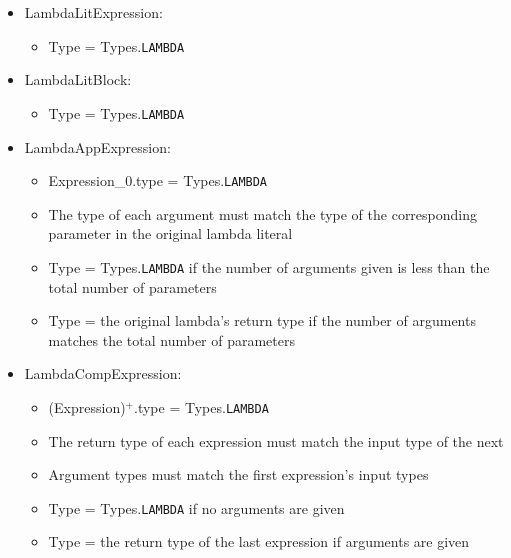 \begin{itemize}
	\item LambdaLitExpression:
		\begin{itemize}
			\item Type = Types.\texttt{LAMBDA}
		\end{itemize}
	\item LambdaLitBlock:
		\begin{itemize}
			\item Type = Types.\texttt{LAMBDA}
		\end{itemize}
	\item LambdaAppExpression:
		\begin{itemize}
			\item Expression\_0.type = Types.\texttt{LAMBDA}
			\item The type of each argument must match the type of the corresponding parameter in the original lambda literal
			\item Type = Types.\texttt{LAMBDA} if the number of arguments given is less than the total number of parameters
			\item Type = the original lambda's return type if the number of arguments matches the total number of parameters
		\end{itemize}
	\item LambdaCompExpression:
		\begin{itemize}
			\item (Expression)$^+$.type = Types.\texttt{LAMBDA}
			\item The return type of each expression must match the input type of the next
			\item Argument types must match the first expression's input types
			\item Type = Types.\texttt{LAMBDA} if no arguments are given
			\item Type = the return type of the last expression if arguments are given
		\end{itemize}
\end{itemize}